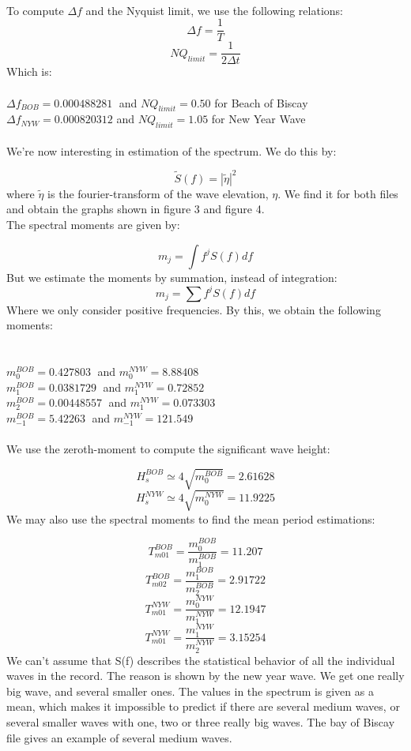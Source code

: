 \documentclass[12pt]{article}
\begin{document}
\\
To compute $\Delta f$ and the Nyquist limit, we use the following relations:
$$ \Delta f = \frac{1}{T}$$
$$ NQ_{limit} = \frac{1}{2 \Delta t}$$
Which is:
\\
\\
$ \Delta f_{BOB} = 0.000488281\;$   and $NQ_{limit} = 0.50$ for Beach of Biscay\\
$ \Delta f_{NYW} = 0.000820312$ and $NQ_{limit} = 1.05$ for New Year Wave\\
\\We're now interesting in estimation of the spectrum. We do this by:

$$\tilde{S}(f) = |\tilde{\eta}|^2 $$
where $\tilde{\eta}$ is the fourier-transform of the wave elevation, $\eta$. We find it for both files and obtain the graphs shown in figure 3 and figure 4.
\\
The spectral moments are given by:

$$ m_j = \int f^j S(f) df $$
But we estimate the moments by summation, instead of integration:
$$ m_j = \sum f^j S(f) df $$
Where we only consider positive frequencies. By this, we obtain the following moments:\\
\\
\\
$ m_0^{BOB} = 0.427803 \;$   and $m_0^{NYW} = 8.88408\;$\\
$ m_1^{BOB} = 0.0381729 \;$   and $m_1^{NYW} =0.72852\;$\\
$ m_2^{BOB} = 0.00448557\;$   and $m_1^{NYW} = 0.073303\;$\\
$ m_{-1}^{BOB} = 5.42263  \;$   and $m_{-1}^{NYW} =121.549\;$\\
\\
We use the zeroth-moment to compute the significant wave height:

$$ H_s^{BOB} \simeq 4 \sqrt{m_0^{BOB}} = 2.61628 $$
$$ H_s^{NYW} \simeq 4 \sqrt{m_0^{NYW}} = 11.9225 $$
We may also use the spectral moments to find the mean period estimations:

$$ T_{m01}^{BOB} = \frac{m_0^{BOB}}{m_1^{BOB}} = 11.207$$
$$ T_{m02}^{BOB} = \frac{m_1^{BOB}}{m_2^{BOB}} = 2.91722$$
$$ T_{m01}^{NYW} = \frac{m_0^{NYW}}{m_1^{NYW}} = 12.1947$$
$$ T_{m01}^{NYW} = \frac{m_1^{NYW}}{m_2^{NYW}} = 3.15254$$
We can't assume that S(f) describes the statistical behavior of all the individual waves in the record. The reason is shown by the new year wave. We get one really big wave, and several smaller ones. The values in the spectrum is given as a mean, which makes it impossible to predict if there are several medium waves, or several smaller waves with one, two or three really big waves. The bay of Biscay file gives an example of several medium waves.
\end{document}
